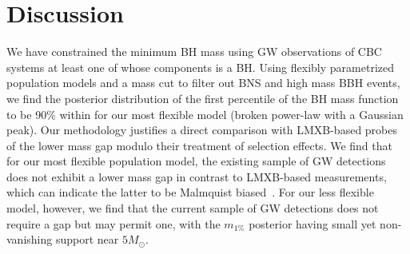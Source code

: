 \documentclass[modern]{aastex631}
\begin{document}

%








\section{Discussion}
\label{sec:discussion}
We have constrained the minimum BH mass using GW observations of CBC systems at least one of whose components is a BH. Using flexibly parametrized population models and a mass cut to filter out BNS and high mass BBH events, we find the posterior distribution of the first percentile of the BH mass function to be 90\% within \monepctplgplpincludingnewunits for our most flexible model (broken power-law with a Gaussian peak). Our methodology justifies a direct comparison with LMXB-based probes of the lower mass gap modulo their treatment of selection effects. We find that for our most flexible population model, the existing sample of GW detections does not exhibit a lower mass gap in contrast to LMXB-based measurements, which can indicate the latter to be Malmquist biased~\citep{Siegel:2022gwc}. For our less flexible model, however, we find that the current sample of GW detections does not require a gap but may permit one, with the $m_{1\%}$ posterior having small yet non-vanishing support near $5M_{\odot}$.
\end{document}
